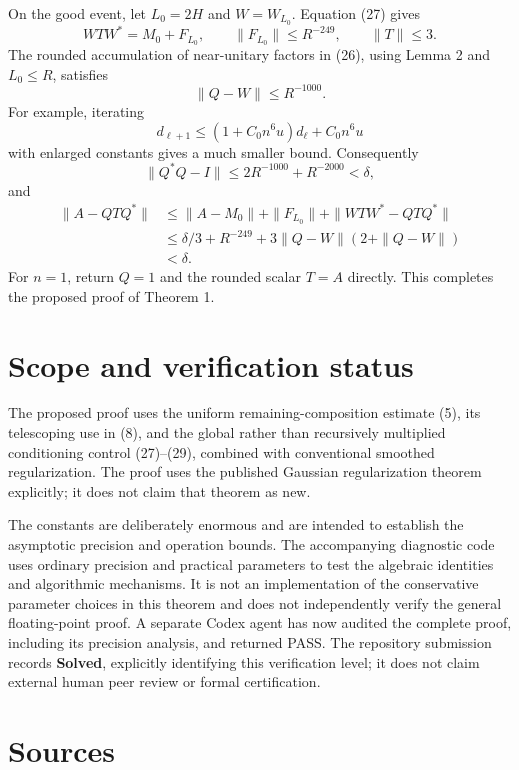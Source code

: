 \documentclass[10pt,a4paper]{article}
\begin{document}
On the good event, let \(L_0=2H\) and \(W=W_{L_0}\). Equation (27) gives
\[
 WT W^*=M_0+F_{L_0},
 \qquad\|F_{L_0}\|\le R^{-249},
 \qquad\|T\|\le3.
\] The rounded accumulation of near-unitary factors in (26), using Lemma
2 and \(L_0\le R\), satisfies \[
 \|Q-W\|\le R^{-1000}.
\] For example, iterating \[
 d_{\ell+1}\le(1+C_0n^6u)d_\ell+C_0n^6u
\] with enlarged constants gives a much smaller bound. Consequently \[
 \|Q^*Q-I\|\le2R^{-1000}+R^{-2000}<\delta,
\] and \[
 \begin{aligned}
 \|A-QTQ^*\|
 &\le\|A-M_0\|+\|F_{L_0}\|
      +\|WTW^*-QTQ^*\|\\
 &\le\delta/3+R^{-249}
      +3\|Q-W\|(2+\|Q-W\|)\\
 &<\delta.
 \end{aligned}
\] For \(n=1\), return \(Q=1\) and the rounded scalar \(T=A\) directly.
This completes the proposed proof of Theorem 1.

\section{Scope and verification
status}\label{scope-and-verification-status}

The proposed proof uses the uniform remaining-composition estimate (5),
its telescoping use in (8), and the global rather than recursively
multiplied conditioning control (27)--(29), combined with conventional
smoothed regularization. The proof uses the published Gaussian
regularization theorem explicitly; it does not claim that theorem as
new.

The constants are deliberately enormous and are intended to establish
the asymptotic precision and operation bounds. The accompanying
diagnostic code uses ordinary precision and practical parameters to test
the algebraic identities and algorithmic mechanisms. It is not an
implementation of the conservative parameter choices in this theorem and
does not independently verify the general floating-point proof. A
separate Codex agent has now audited the complete proof, including its
precision analysis, and returned PASS. The repository submission records
\textbf{Solved}, explicitly identifying this verification level; it does
not claim external human peer review or formal certification.

\section{Sources}\label{sources}
\end{document}
